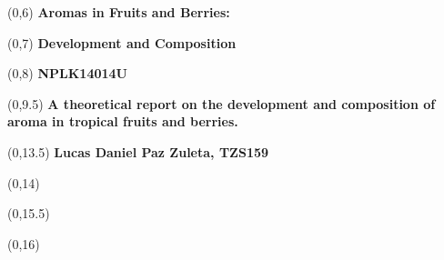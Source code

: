 \begin{titlepage}

    
    \begin{textblock}{9.4}(0,6)
        \Huge{\selectfont\bfseries{Aromas in Fruits and Berries: }}
    \end{textblock}
    \begin{textblock}{9.4}(0,7)
        \Huge{\selectfont\bfseries{Development and Composition}}
    \end{textblock}
    \begin{textblock}{9.4}(0,8)
        \Huge{\selectfont\bfseries{NPLK14014U}}
    \end{textblock}
    
    \begin{textblock}{9.4}(0,9.5)
        \LARGE{\selectfont\bfseries{A theoretical report on the development and composition of aroma in tropical fruits and berries.}}
    \end{textblock}
    

    \begin{textblock}{9.4}(0,13.5)
        \large{\selectfont\bfseries{
        Lucas Daniel Paz Zuleta, TZS159}}
    \end{textblock}
    
    \begin{textblock}{9.4}(0,14)
        \large{\selectfont{MSc students at the University of Copenhagen}}
    \end{textblock}
    

    \begin{textblock}{9.4}(0,15.5)
        \large{\selectfont{Last compiled: \today}}
    \end{textblock}
    
    \begin{textblock}{8.4}(0,16)
        \large{}
    \end{textblock}
    

\end{titlepage}
